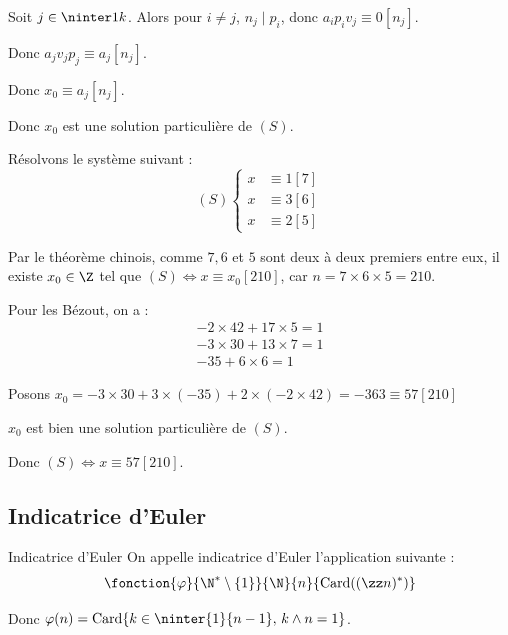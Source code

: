 Soit $j \in \ninter 1 k$. Alors pour $i \neq j$, $n_j \mid p_i$, donc $a_ip_iv_j \equiv 0 [n_j]$.

Donc $a_j v_j p_j \equiv a_j [n_j]$.

Donc $x_0 \equiv a_j [n_j]$.

Donc $x_0$ est une solution particulière de $(S)$.

\begin{exemple}
    Résolvons le système suivant : 
    \[
        (S) \left\{ 
            \begin{aligned}
                x & \equiv 1 [7] \\
                x & \equiv 3 [6] \\
                x & \equiv 2 [5]
            \end{aligned}
        \right.
    \]

    Par le théorème chinois, comme $7, 6$ et $5$ sont deux à deux premiers entre eux, 
    il existe $x_0 \in \Z$ tel que $(S) \Leftrightarrow x \equiv x_0 [210]$, car 
    $n = 7 \times 6 \times 5 = 210$.

    Pour les Bézout, on a :
    \[
        \begin{array}{rcl}
            -2 \times 42 + 17 \times 5 = 1 \\
            -3 \times 30 + 13 \times 7 = 1 \\
            - 35 + 6 \times 6 = 1
        \end{array}
    \]

    Posons $x_0 = -3 \times 30 + 3 \times (-35) + 2 \times (-2 \times 42) = -363 \equiv 57 [210] $

    $x_0$ est bien une solution particulière de $(S)$.

    Donc $(S) \Leftrightarrow x \equiv 57 [210]$.
\end{exemple}

\subsection{Indicatrice d'Euler}

\begin{definition}{Indicatrice d'Euler}{}
    On appelle indicatrice d'Euler l'application suivante : 
    \[\fonction{\varphi}{\N^* \setminus \{1 \}}{\N}{n}{\operatorname{Card}((\zz n)^*)}\]

    Donc $\varphi(n) = \operatorname{Card}\{ k \in \ninter{1}{n - 1} , \, k \wedge n = 1\}$.
\end{definition}

